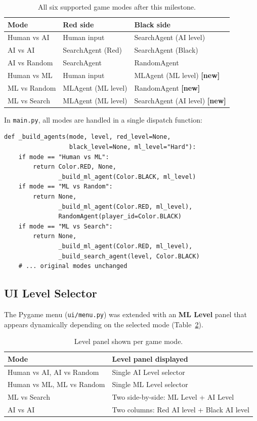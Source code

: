 \begin{table}[H]
\centering
\caption{All six supported game modes after this milestone.}
\label{tab:modes}
\begin{tabular}{lll}
\toprule
\textbf{Mode} & \textbf{Red side} & \textbf{Black side} \\
\midrule
Human vs AI    & Human input        & SearchAgent (AI level) \\
AI vs AI       & SearchAgent (Red)  & SearchAgent (Black) \\
AI vs Random   & SearchAgent        & RandomAgent \\
Human vs ML    & Human input        & MLAgent (ML level) \textbf{[new]} \\
ML vs Random   & MLAgent (ML level) & RandomAgent        \textbf{[new]} \\
ML vs Search   & MLAgent (ML level) & SearchAgent (AI level) \textbf{[new]} \\
\bottomrule
\end{tabular}
\end{table}

In \texttt{main.py}, all modes are handled in a single dispatch function:

\begin{lstlisting}[caption={\texttt{\_build\_agents} dispatch (new branches)}]
def _build_agents(mode, level, red_level=None,
                  black_level=None, ml_level="Hard"):
    if mode == "Human vs ML":
        return Color.RED, None,
               _build_ml_agent(Color.BLACK, ml_level)
    if mode == "ML vs Random":
        return None,
               _build_ml_agent(Color.RED, ml_level),
               RandomAgent(player_id=Color.BLACK)
    if mode == "ML vs Search":
        return None,
               _build_ml_agent(Color.RED, ml_level),
               _build_search_agent(level, Color.BLACK)
    # ... original modes unchanged
\end{lstlisting}

\subsection{UI Level Selector}
\label{sec:ui-level}

The Pygame menu (\texttt{ui/menu.py}) was extended with an
\textbf{ML Level} panel that appears dynamically depending on the
selected mode (Table~\ref{tab:panels}).

\begin{table}[H]
\centering
\caption{Level panel shown per game mode.}
\label{tab:panels}
\begin{tabular}{ll}
\toprule
\textbf{Mode} & \textbf{Level panel displayed} \\
\midrule
Human vs AI, AI vs Random & Single AI Level selector \\
Human vs ML, ML vs Random & Single ML Level selector \\
ML vs Search & Two side-by-side: ML Level + AI Level \\
AI vs AI & Two columns: Red AI level + Black AI level \\
\bottomrule
\end{tabular}
\end{table}

